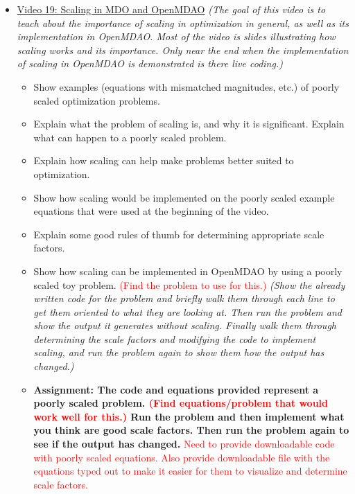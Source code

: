 \documentclass[12pt, letterpaper]{article}
\begin{document}
\begin{itemize}
	\item \underline{Video 19: Scaling in MDO and OpenMDAO} \textit{(The goal of this video is to teach about the importance of scaling in optimization in general, as well as its implementation in OpenMDAO. Most of the video is slides illustrating how scaling works and its importance. Only near the end when the implementation of scaling in OpenMDAO is demonstrated is there live coding.)}
		\begin{itemize}
			\item Show examples (equations with mismatched magnitudes, etc.) of poorly scaled optimization problems.
			\item Explain what the problem of scaling is, and why it is significant. Explain what can happen to a poorly scaled problem.
			\item Explain how scaling can help make problems better suited to optimization.
			\item Show how scaling would be implemented on the poorly scaled example equations that were used at the beginning of the video.
			\item Explain some good rules of thumb for determining appropriate scale factors.
			\item Show how scaling can be implemented in OpenMDAO by using a poorly scaled toy problem. \textcolor{red}{(Find the problem to use for this.)} \textit{(Show the already written code for the problem and briefly walk them through each line to get them oriented to what they are looking at. Then run the problem and show the output it generates without scaling. Finally walk them through determining the scale factors and modifying the code to implement scaling, and run the problem again to show them how the output has changed.)}
			\item \textbf{Assignment: The code and equations provided represent a poorly scaled problem. \textcolor{red}{(Find equations/problem that would work well for this.)} Run the problem and then implement what you think are good scale factors. Then run the problem again to see if the output has changed.} \textcolor{red}{Need to provide downloadable code with poorly scaled equations. Also provide downloadable file with the equations typed out to make it easier for them to visualize and determine scale factors.}
		\end{itemize}
		

\end{itemize}
\end{document}
